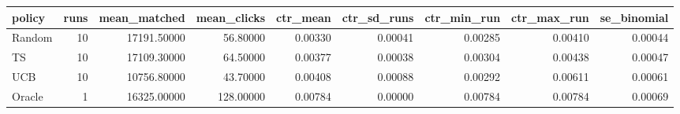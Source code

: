 \begin{tabular}{lrrrrrrrr}
\toprule
policy & runs & mean\_matched & mean\_clicks & ctr\_mean & ctr\_sd\_runs & ctr\_min\_run & ctr\_max\_run & se\_binomial \\
\midrule
Random & 10 & 17191.50000 & 56.80000 & 0.00330 & 0.00041 & 0.00285 & 0.00410 & 0.00044 \\
TS & 10 & 17109.30000 & 64.50000 & 0.00377 & 0.00038 & 0.00304 & 0.00438 & 0.00047 \\
UCB & 10 & 10756.80000 & 43.70000 & 0.00408 & 0.00088 & 0.00292 & 0.00611 & 0.00061 \\
Oracle & 1 & 16325.00000 & 128.00000 & 0.00784 & 0.00000 & 0.00784 & 0.00784 & 0.00069 \\
\bottomrule
\end{tabular}
